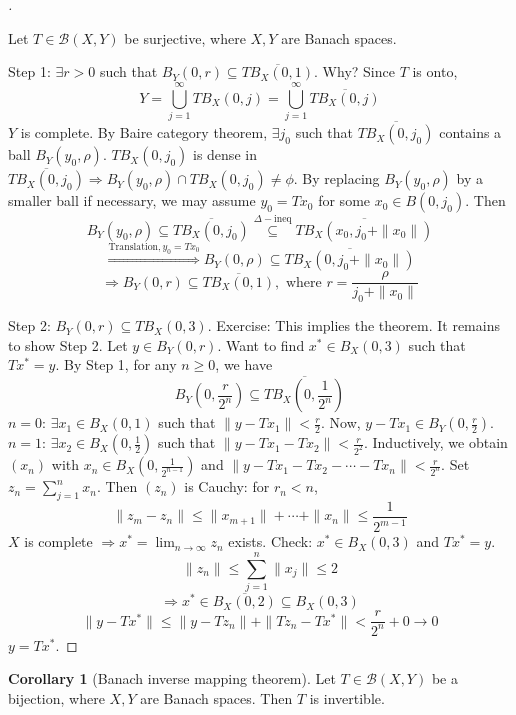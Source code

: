 \documentclass{article}
\theoremstyle{definition}
\newtheorem{cor}{Corollary}
\newenvironment{proofs}[1][\proofname]{%
  \begin{proof}[#1]$ $\par\nobreak\ignorespaces
}{%
  \end{proof}
}
\begin{document}
\begin{proofs}
	Let $T \in \mathcal{B}(X, Y)$ be surjective, where $X, Y$ are Banach spaces.
	\par Step 1: $\exists r > 0$ such that $B_Y(0, r) \subseteq \overline{T B_X(0, 1)}$.
	Why? Since $T$ is onto, 
	\[
		Y = \bigcup_{j = 1}^\infty T B_X(0, j) = \bigcup_{j = 1}^\infty \overline{T B_X(0, j)}
	\]
	$Y$ is complete.
	By Baire category theorem, $\exists j_0$ such that $\overline{T B_X(0, j_0)}$ contains a ball $B_Y(y_0, \rho)$.
	$TB_X(0, j_0)$ is dense in $\overline{T B_X(0, j_0)} \Rightarrow B_Y (y_0, \rho) \cap T B_X(0, j_0) \neq \phi$.
	By replacing $B_Y(y_0, \rho)$ by a smaller ball if necessary, we may assume $y_0 = T x_0$ for some $x_0 \in B(0, j_0)$.
	Then 
	\[
		B_Y(y_0, \rho) \subseteq \overline{T B_X(0, j_0)} \stackrel{\Delta-\text{ineq}}{\subseteq} \overline{T B_X(x_0, j_0 + \|x_0\|)}
	\]
	\[
		\stackrel{\text{Translation}, y_0 = T x_0}{\Rightarrow} B_Y(0, \rho) \subseteq \overline{T B_X(0, j_0 + \|x_0\|)}
	\]
	\[
		\Rightarrow B_Y(0, r) \subseteq \overline{T B_X(0, 1)}, \text{ where } r = \frac{\rho}{j_0 + \|x_0\|}
	\]
	\par Step 2: $B_Y(0, r) \subseteq T B_X(0, 3)$.
	Exercise: This implies the theorem.
	It remains to show Step 2.
	Let $y \in B_Y(0, r)$. 
	Want to find $x^* \in B_X(0, 3)$ such that $T x^* = y$.
	By Step 1, for any $n \geq 0$, we have
	\[
		B_Y\left(0, \frac{r}{2^n} \right) \subseteq \overline{T B_X\left(0, \frac{1}{2^n} \right)}
	\]
	$n = 0$: $\exists x_1 \in B_X(0, 1)$ such that $\|y - T x_1\| < \frac{r}{2}$.
	Now, $y - Tx_1 \in B_Y\left( 0, \frac{r}{2} \right)$.\\
	$n = 1$: $\exists x_2 \in B_X\left( 0, \frac{1}{2} \right)$ such that $\|y - T x_1 - T x_2 \| < \frac{r}{2^2}$.
	Inductively, we obtain $(x_n)$ with $x_n \in B_X\left( 0, \frac{1}{2^{n - 1}} \right)$ and $\|y - T x_1 - T x_2 - \cdots - T x_n \| < \frac{r}{2^n}$.
	Set $z_n = \sum_{j = 1}^n x_n$.
	Then $(z_n)$ is Cauchy: for $r_n < n$, 
	\[
		\|z_m - z_n\| \leq \|x_{m + 1}\| + \cdots + \| x_n \| \leq \frac{1}{2^{m-  1}}
	\]
	$X$ is complete $\Rightarrow x^* = \lim_{n \to \infty} z_n$ exists.
	Check: $x^*\in B_X(0, 3)$ and $T x^* = y$.
	\[
		\|z_n\| \leq \sum_{j = 1}^n \|x_j\| \leq 2
	\]
	\[
		\Rightarrow x^* \in \overline{B_X(0, 2)} \subseteq B_X(0, 3)
	\]
	\[
		\|y - T x^*\| \leq \|y - T z_n\| + \|T z_n - T x^*\| < \frac{r}{2^n} + 0 \to 0
	\]
	$y = T x^*$.
\end{proofs}

\begin{cor}[Banach inverse mapping theorem]
	Let $T \in \mathcal{B}(X, Y)$ be a bijection, where $X, Y$ are Banach spaces.
	Then $T$ is invertible.
\end{cor}
\end{document}
